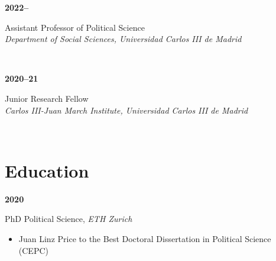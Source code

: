 \documentclass[a4paper, 12pt]{article}
\begin{document}
\begin{minipage}[t]{0.12\textwidth}
\textbf{2022--}
\end{minipage}\hfill\begin{minipage}[t]{0.88\textwidth}
Assistant Professor of Political Science\\
\textit{Department of Social Sciences, Universidad Carlos III de Madrid}\\\vspace{-8pt}
\end{minipage}\\
\begin{minipage}[t]{0.12\textwidth}
\textbf{2020--21}
\end{minipage}\hfill\begin{minipage}[t]{0.88\textwidth}
Junior Research Fellow\\
\textit{Carlos III-Juan March Institute, Universidad Carlos III de Madrid}\\\vspace{-8pt}
\end{minipage}\\

\vspace{-10pt}
\section*{Education}

\begin{minipage}[t]{0.1\textwidth}
  \flushleft
	\textbf{2020}
\end{minipage}
\begin{minipage}[t]{0.9\textwidth}
  PhD Political Science, \textit{ETH Zurich}
	\vspace{-5pt}
	\begin{itemize}\small
	  \item Juan Linz Price to the Best Doctoral Dissertation in Political Science (CEPC)
	\end{itemize}
\end{minipage}
\end{document}
